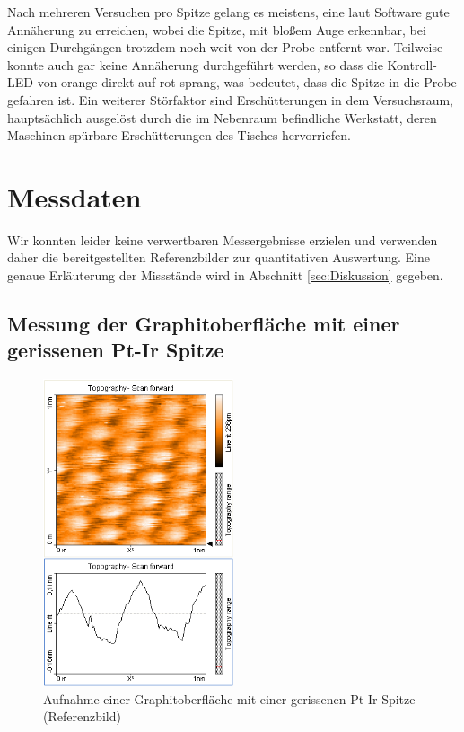 \documentclass[10pt, a4paper]{article}
\begin{document}
Nach mehreren Versuchen pro Spitze gelang es meistens, eine laut Software gute Annäherung zu erreichen, wobei die Spitze, mit bloßem Auge erkennbar, bei einigen Durchgängen trotzdem noch weit von der Probe entfernt war.
Teilweise konnte auch gar keine Annäherung durchgeführt werden, so dass die Kontroll-LED von orange direkt auf rot sprang, was bedeutet, dass die Spitze in die Probe gefahren ist.
Ein weiterer Störfaktor sind Erschütterungen in dem Versuchsraum, hauptsächlich ausgelöst durch die im Nebenraum befindliche Werkstatt, deren Maschinen spürbare Erschütterungen des Tisches hervorriefen.

\section{Messdaten}
Wir konnten leider keine verwertbaren Messergebnisse erzielen und verwenden daher die bereitgestellten Referenzbilder zur quantitativen Auswertung.
Eine genaue Erläuterung der Missstände wird in Abschnitt \ref{sec:Diskussion} gegeben.

\subsection{Messung der Graphitoberfläche mit einer gerissenen Pt-Ir Spitze}
\begin{figure}[h]
\centering
\includegraphics[width=0.5\textwidth]{./grafiken/originale/ref_graphit_pt_ir_1nm.png}
\caption{Aufnahme einer Graphitoberfläche mit einer gerissenen Pt-Ir Spitze (Referenzbild)}
\label{fig:ref_ptir}
\end{figure}
\end{document}
